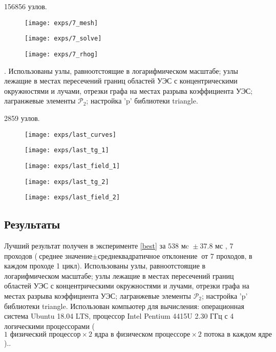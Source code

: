 156856 узлов.

\begin{figure}[H]
  \texttt{[image: exps/7\_mesh]}
\end{figure}
\begin{figure}[H]
  \texttt{[image: exps/7\_solve]}
\end{figure}
\begin{figure}[H]
  \texttt{[image: exps/7\_rhog]}
\end{figure}


 \theexp \label{best}.
Использованы узлы, равноотстоящие в логарифмическом масштабе;
узлы лежащие в местах пересечений границ областей УЭС с концентрическими окружностями и лучами,
отрезки графа на местах разрыва коэффициента УЭС; лагранжевые элементы ${\mathcal{P}_2}$; настройка 'p' библиотеки triangle.

2859 узлов.

\begin{figure}[H]
\texttt{[image: exps/last\_curves]}
\caption{}
\end{figure}

\begin{figure}[H]
\texttt{[image: exps/last\_tg\_1]}
\caption{}
\end{figure}

\begin{figure}[H]
\texttt{[image: exps/last\_field\_1]}
\caption{}
\end{figure}

\begin{figure}[H]
\texttt{[image: exps/last\_tg\_2]}
\caption{}
\end{figure}

\begin{figure}[H]
\texttt{[image: exps/last\_field\_2]}
\caption{}
\end{figure}


\subsection{Результаты}

Лучший результат получен в эксперименте \ref{best} за ${538 \text{ мc } \pm 37.8 \text{ мс }}$, 7 проходов
(${\text{среднее значение} \pm \text{среднеквадратичное отклонение}}$ от 7 проходов, в каждом проходе 1 цикл). Использованы узлы, равноотстоящие в логарифмическом масштабе; узлы лежащие в местах пересечений границ областей УЭС с концентрическими окружностями и лучами, отрезки графа на местах разрыва коэффициента УЭС; лагранжевые элементы ${\mathcal{P}_2}$; настройка 'p' библиотеки triangle. Использован компьютер для вычисления: операционная система Ubuntu 18.04 LTS, процессор Intel Pentium 4415U 2.30 ГГц с 4 логическими процессорами ($1 \text{ физический процессор} \times 2 \text{ ядра в физическом процессоре} \times 2 \text{ потока в каждом ядре}$)..

